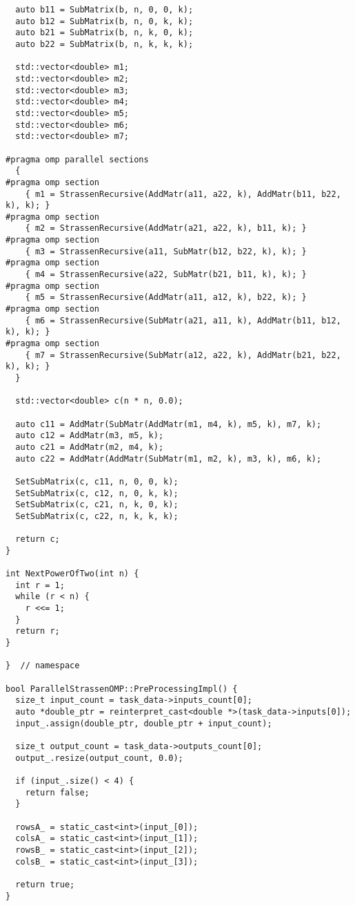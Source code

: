 \documentclass[12pt]{article}
\begin{document}
\begin{lstlisting}
  auto b11 = SubMatrix(b, n, 0, 0, k);
  auto b12 = SubMatrix(b, n, 0, k, k);
  auto b21 = SubMatrix(b, n, k, 0, k);
  auto b22 = SubMatrix(b, n, k, k, k);

  std::vector<double> m1;
  std::vector<double> m2;
  std::vector<double> m3;
  std::vector<double> m4;
  std::vector<double> m5;
  std::vector<double> m6;
  std::vector<double> m7;

#pragma omp parallel sections
  {
#pragma omp section
    { m1 = StrassenRecursive(AddMatr(a11, a22, k), AddMatr(b11, b22, k), k); }
#pragma omp section
    { m2 = StrassenRecursive(AddMatr(a21, a22, k), b11, k); }
#pragma omp section
    { m3 = StrassenRecursive(a11, SubMatr(b12, b22, k), k); }
#pragma omp section
    { m4 = StrassenRecursive(a22, SubMatr(b21, b11, k), k); }
#pragma omp section
    { m5 = StrassenRecursive(AddMatr(a11, a12, k), b22, k); }
#pragma omp section
    { m6 = StrassenRecursive(SubMatr(a21, a11, k), AddMatr(b11, b12, k), k); }
#pragma omp section
    { m7 = StrassenRecursive(SubMatr(a12, a22, k), AddMatr(b21, b22, k), k); }
  }

  std::vector<double> c(n * n, 0.0);

  auto c11 = AddMatr(SubMatr(AddMatr(m1, m4, k), m5, k), m7, k);
  auto c12 = AddMatr(m3, m5, k);
  auto c21 = AddMatr(m2, m4, k);
  auto c22 = AddMatr(AddMatr(SubMatr(m1, m2, k), m3, k), m6, k);

  SetSubMatrix(c, c11, n, 0, 0, k);
  SetSubMatrix(c, c12, n, 0, k, k);
  SetSubMatrix(c, c21, n, k, 0, k);
  SetSubMatrix(c, c22, n, k, k, k);

  return c;
}

int NextPowerOfTwo(int n) {
  int r = 1;
  while (r < n) {
    r <<= 1;
  }
  return r;
}

}  // namespace

bool ParallelStrassenOMP::PreProcessingImpl() {
  size_t input_count = task_data->inputs_count[0];
  auto *double_ptr = reinterpret_cast<double *>(task_data->inputs[0]);
  input_.assign(double_ptr, double_ptr + input_count);

  size_t output_count = task_data->outputs_count[0];
  output_.resize(output_count, 0.0);

  if (input_.size() < 4) {
    return false;
  }

  rowsA_ = static_cast<int>(input_[0]);
  colsA_ = static_cast<int>(input_[1]);
  rowsB_ = static_cast<int>(input_[2]);
  colsB_ = static_cast<int>(input_[3]);

  return true;
}


\end{lstlisting}
\end{document}
